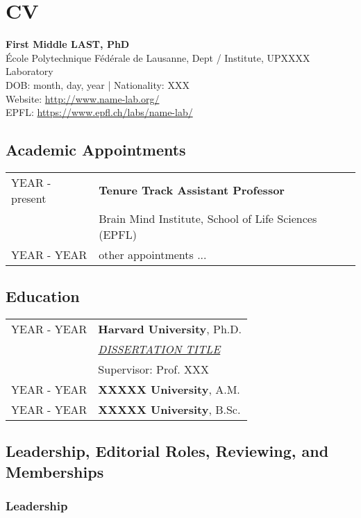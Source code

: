 \chapter{CV}
\label{cv}

\vspace{-10mm}

\large \textbf{First Middle LAST, PhD
}\\
École Polytechnique Fédérale de Lausanne, 
Dept / Institute,
UPXXXX Laboratory	\\	
DOB: month, day, year | Nationality: XXX\\
Website: \url{http://www.name-lab.org/}\\
EPFL: \url{https://www.epfl.ch/labs/name-lab/}

\section{Academic Appointments}							
\begin{tabular}[l]{ p{} p{} }
YEAR - present & \textbf{Tenure Track Assistant Professor}\\ & Brain Mind Institute, School of Life Sciences (EPFL)\\
YEAR - YEAR & other appointments ... 
\end{tabular} 

\section{Education}								

\begin{tabular}[l]{ p{} p{} }

YEAR - YEAR & {\bf Harvard University}, 	Ph.D.\\  & {\it \href{link-to-your-dissertation}{DISSERTATION TITLE}}\\ & Supervisor: Prof. XXX \\
YEAR - YEAR & {\bf XXXXX University}, 	A.M.\\
YEAR - YEAR & {\bf XXXXX University}, B.Sc.
\end{tabular}


\section{Leadership, Editorial Roles, Reviewing, and Memberships}	

\subsection{Leadership}

